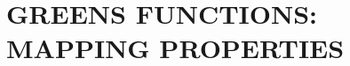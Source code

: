 \documentclass[ILW\ Notes.tex]{subfiles}
\begin{document}
\chapter{GREENS FUNCTIONS: MAPPING PROPERTIES}\label{cptr02:GFmapping}








\end{document}
